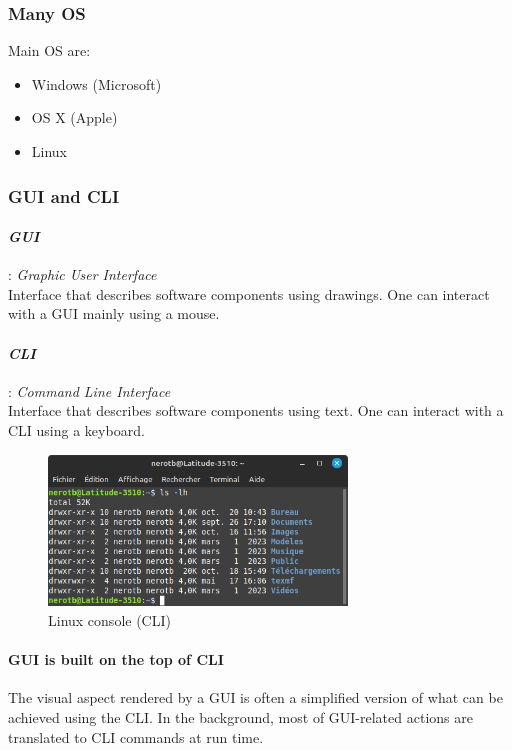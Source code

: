 \documentclass[11pt]{article}
\begin{document}
			\subsubsection{Many OS}
				Main OS are:
				\begin{itemize}
					\item Windows (Microsoft)
					\item OS X (Apple)
					\item Linux
				\end{itemize}

			\subsubsection{GUI and CLI}

				\paragraph{\textit{GUI}}: \textit{Graphic User Interface} \\
					Interface that describes software components using drawings. One can interact with a GUI mainly using a mouse.

				\paragraph{\textit{CLI}}: \textit{Command Line Interface} \\
					Interface that describes software components using text. One can interact with a CLI using a keyboard.
					\begin{figure}[!h]
							\centering
							\includegraphics[width=300px]{figures/CLI.png}
							\caption{Linux console (CLI)}
					\end{figure}

				\paragraph{GUI is built on the top of CLI}
					The visual aspect rendered by a GUI is often a simplified version of what can be achieved using the CLI. In the 
					background, most of GUI-related actions are translated to CLI commands at run time.
\end{document}
